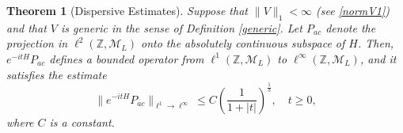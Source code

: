 \documentclass[12pt,oneside,onecolumn,open]{article}
\newtheorem{teo}{Theorem}[section]
\begin{document}
\begin{teo}[Dispersive Estimates] \label{teo:estimacion}
Suppose that \( \| V\|_1 < \infty \) (see \eqref{normV1}) and that \(V\) is generic in the sense of Definition \ref{generic}. Let \(P_{ac}\) denote the projection in \(\ell^{2}( \mathbb{Z}, \mathcal{M}_L )\) onto the absolutely continuous subspace of \(H\). Then, \(e^{-itH}P_{ac}\) defines a bounded operator from \( \ell^1( \mathbb{Z}, \mathcal{M}_L ) \) to \(\ell^\infty( \mathbb{Z}, \mathcal{M}_L )\), and it satisfies the estimate
\begin{equation} 
\label{eq:EST}
    \|e^{-itH}P_{ac}\|_{\ell^{1} \to \ell^{\infty}} \leq C \left( \frac{1}{1 + |t|} \right)^{\frac{1}{3}}, \quad t \geq 0,
\end{equation}
where \(C\) is a constant.
\end{teo}





\end{document}
